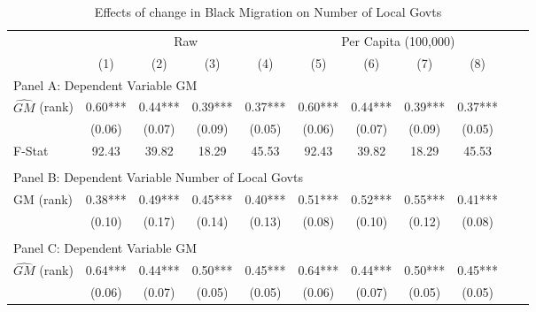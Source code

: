  \begin{table}[htbp]\centering {} \begin{threeparttable} \caption{Effects of change in Black Migration on Number of Local Govts} \begin{tabular}{l*{10}{c}} \toprule
                &\multicolumn{4}{c}{Raw}                                    &\multicolumn{4}{c}{Per Capita (100,000)}                   \\\cmidrule(lr){2-5}\cmidrule(lr){6-9}
                &\multicolumn{1}{c}{(1)}   &\multicolumn{1}{c}{(2)}   &\multicolumn{1}{c}{(3)}   &\multicolumn{1}{c}{(4)}   &\multicolumn{1}{c}{(5)}   &\multicolumn{1}{c}{(6)}   &\multicolumn{1}{c}{(7)}   &\multicolumn{1}{c}{(8)}   \\
\cmidrule(lr){1-9}
\multicolumn{8}{l}{Panel A: Dependent Variable GM}\\
\cmidrule(lr){1-9}
$\hat{GM}$ (rank)&       0.60***&       0.44***&       0.39***&       0.37***&       0.60***&       0.44***&       0.39***&       0.37***\\
                &     (0.06)   &     (0.07)   &     (0.09)   &     (0.05)   &     (0.06)   &     (0.07)   &     (0.09)   &     (0.05)   \\
\midrule
F-Stat          &      92.43   &      39.82   &      18.29   &      45.53   &      92.43   &      39.82   &      18.29   &      45.53   \\
\cmidrule[\heavyrulewidth](lr){1-9} \\ \cmidrule[\heavyrulewidth](lr){1-9}
\multicolumn{8}{l}{Panel B: Dependent Variable Number of Local Govts}\\
\cmidrule(lr){1-9}
GM  (rank)      &       0.38***&       0.49***&       0.45***&       0.40***&       0.51***&       0.52***&       0.55***&       0.41***\\
                &     (0.10)   &     (0.17)   &     (0.14)   &     (0.13)   &     (0.08)   &     (0.10)   &     (0.12)   &     (0.08)   \\
\cmidrule[\heavyrulewidth](lr){1-9} \\ \cmidrule[\heavyrulewidth](lr){1-9}
\multicolumn{8}{l}{Panel C: Dependent Variable GM}\\
\cmidrule(lr){1-9}
$\hat{GM}$ (rank)&       0.64***&       0.44***&       0.50***&       0.45***&       0.64***&       0.44***&       0.50***&       0.45***\\
                &     (0.06)   &     (0.07)   &     (0.05)   &     (0.05)   &     (0.06)   &     (0.07)   &     (0.05)   &     (0.05)   \\

\end{tabular}
\end{threeparttable}
\end{table}
